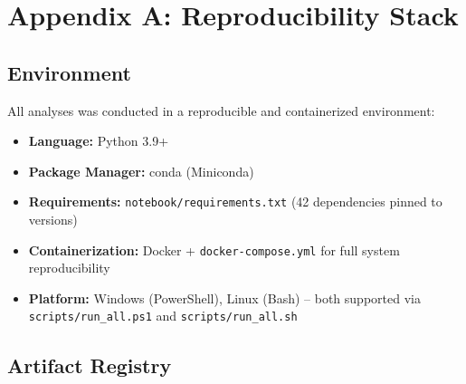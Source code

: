 \documentclass[12pt,a4paper]{article}
\begin{document}
\section*{Appendix A: Reproducibility Stack}

\subsection*{Environment}

All analyses was conducted in a reproducible and containerized environment:

\begin{itemize}
    \item \textbf{Language:} Python 3.9+
    \item \textbf{Package Manager:} conda (Miniconda)
    \item \textbf{Requirements:} \texttt{notebook/requirements.txt} (42 dependencies pinned to versions)
    \item \textbf{Containerization:} Docker + \texttt{docker-compose.yml} for full system reproducibility
    \item \textbf{Platform:} Windows (PowerShell), Linux (Bash) -- both supported via \texttt{scripts/run\_all.ps1} and \texttt{scripts/run\_all.sh}
\end{itemize}

\subsection*{Artifact Registry}
\end{document}
